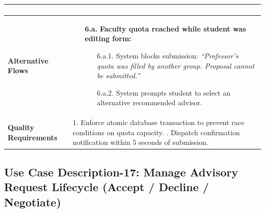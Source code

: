 \begin{table}[H]
\begin{tabularx}{\textwidth}{|l|X|}
\begin{enumerate}[leftmargin=*]
\end{enumerate} \\ \hline
\textbf{Alternative Flows} &
\begin{itemize}[leftmargin=*]
    \item[\textbf{6.a.}] \textbf{Faculty quota reached while student was editing form:}
    \begin{itemize}[leftmargin=*]
        \item[6.a.1.] System blocks submission: \textit{``Professor's quota was filled by another group. Proposal cannot be submitted.''}
        \item[6.a.2.] System prompts student to select an alternative recommended advisor.
    \end{itemize}
\end{itemize} \\ \hline
\textbf{Quality Requirements} & 
1. Enforce atomic database transaction to prevent race conditions on quota capacity. \newline
2. Dispatch confirmation notification within 5 seconds of submission. \\ \hline
\end{tabularx}
\end{table}

\clearpage
\subsection{Use Case Description-17: Manage Advisory Request Lifecycle (Accept / Decline / Negotiate)}
\label{subsec:uc17}

